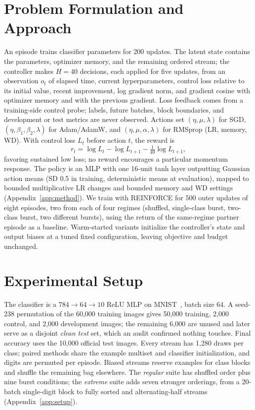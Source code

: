 \documentclass{article}
\begin{document}
\section{Problem Formulation and Approach}
An episode trains classifier parameters for 200 updates. The latent state contains the parameters, optimizer memory, and the remaining ordered stream; the controller makes $H=40$ decisions, each applied for five updates, from an observation $o_t$ of elapsed time, current hyperparameters, control loss relative to its initial value, recent improvement, log gradient norm, and gradient cosine with optimizer memory and with the previous gradient. Loss feedback comes from a training-side control probe; labels, future batches, block boundaries, and development or test metrics are never observed. Actions set $(\eta,\mu,\lambda)$ for SGD, $(\eta,\beta_1,\beta_2,\lambda)$ for Adam/AdamW, and $(\eta,\mu,\alpha,\lambda)$ for RMSprop (LR, memory, WD). With control loss $L_t$ before action $t$, the reward is
\begin{equation}
 r_t=\log L_t-\log L_{t+1}-\tfrac{1}{40}\log L_{t+1},
\end{equation}
favoring sustained low loss; no reward encourages a particular momentum response. The policy is an MLP with one 16-unit tanh layer outputting Gaussian action means (SD 0.5 in training, deterministic means at evaluation), mapped to bounded multiplicative LR changes and bounded memory and WD settings (Appendix~\ref{app:method}). We train with REINFORCE for 500 outer updates of eight episodes, two from each of four regimes (shuffled, single-class burst, two-class burst, two different bursts), using the return of the same-regime partner episode as a baseline. Warm-started variants initialize the controller's state and output biases at a tuned fixed configuration, leaving objective and budget unchanged.

\section{Experimental Setup}
The classifier is a $784\rightarrow64\rightarrow10$ ReLU MLP on MNIST~\cite{lecun1998}, batch size 64. A seed-238 permutation of the 60,000 training images gives 50,000 training, 2,000 control, and 2,000 development images; the remaining 6,000 are unused and later serve as a disjoint \emph{clean test} set, which an audit confirmed nothing touches. Final accuracy uses the 10,000 official test images. Every stream has 1,280 draws per class; paired methods share the example multiset and classifier initialization, and digits are permuted per episode. Biased streams reserve examples for class blocks and shuffle the remaining bag elsewhere. The \emph{regular} suite has shuffled order plus nine burst conditions; the \emph{extreme} suite adds seven stronger orderings, from a 20-batch single-digit block to fully sorted and alternating-half streams (Appendix~\ref{app:setup}).
\end{document}
